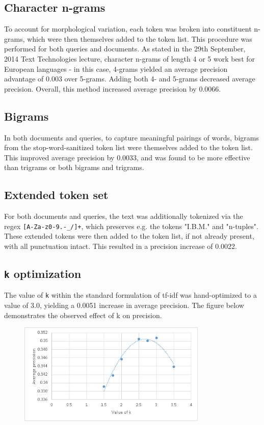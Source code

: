 \documentclass{article}
\begin{document}
\subsection{Character n-grams}
To account for morphological variation, each token was broken into constituent n-grams, which were then themselves added to the token list. This procedure was performed for both queries and documents. As stated in the 29th September, 2014 Text Technologies lecture, character n-grams of length 4 or 5 work best for European languages - in this case, 4-grams yielded an average precision advantage of 0.003 over 5-grams. Adding both 4- and 5-grams decreased average precision. Overall, this method increased average precision by 0.0066.
\subsection{Bigrams}
In both documents and queries, to capture meaningful pairings of words, bigrams from the stop-word-sanitized token list were themselves added to the token list. This improved average precision by 0.0033, and was found to be more effective than trigrams or both bigrams and trigrams.
\subsection{Extended token set}
For both documents and queries, the text was additionally tokenized via the regex \texttt{[A-Za-z0-9.-\_/]+}, which preserves e.g. the tokens "I.B.M." and "n-tuples". These extended tokens were then added to the token list, if not already present, with all punctuation intact. This resulted in a precision increase of 0.0022.
\subsection{\texttt{k} optimization}
The value of \texttt{k} within the standard formulation of tf-idf was hand-optimized to a value of 3.0, yielding a 0.0051 increase in average precision. The figure below demonstrates the observed effect of k on precision.
\begin{figure}[ht!]
\centering
\includegraphics[width=90mm]{k_graph2.png}
\end{figure}
\end{document}
